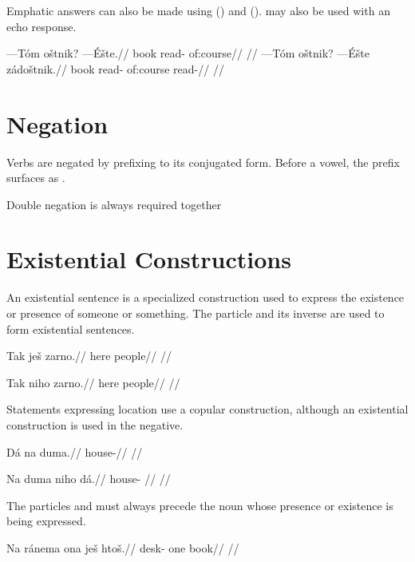 Emphatic answers can also be made using  () and   ().  may also be used with an echo response.

\pex
\a
\begingl
\gla ---T\'om o\v{s}tnik? ---\'E\v{s}te.//
\glb book read- of:course//
\glft {}//
\endgl
\a
\begingl
\gla ---T\'om o\v{s}tnik? ---\'E\v{s}te z\'ado\v{s}tnik.//
\glb book read- of:course read-//
\glft {}//
\endgl
\xe

\section{Negation}
Verbs are negated by prefixing  to its conjugated form. Before a vowel, the prefix surfaces as .

Double negation is always required together


\section{Existential Constructions}
\label{sec:exst}
An existential sentence is a specialized construction used to express the existence or presence of someone or something. The particle  and its inverse  are used to form existential sentences.

\pex
\begingl
\gla Tak je\v{s} zarno.//
\glb here  people//
\glft {}//
\endgl
\xe

\pex
\begingl
\gla Tak niho zarno.//
\glb here  people//
\glft {}//
\endgl
\xe

Statements expressing location use a copular construction, although an existential construction is used in the negative.

\pex
\begingl
\gla D\'a na duma.//
\glb {}  house-//
\glft {}//
\endgl
\xe

\pex
\begingl
\gla Na duma niho d\'a.//
\glb {} house-  //
\glft {}//
\endgl
\xe

The particles  and  must always precede the noun whose presence or existence is being expressed.

\pex
\begingl
\gla Na r\'anema ona je\v{s} hto\v{s}.//
\glb {} desk- one  book//
\glft {}//
\endgl
\xe

